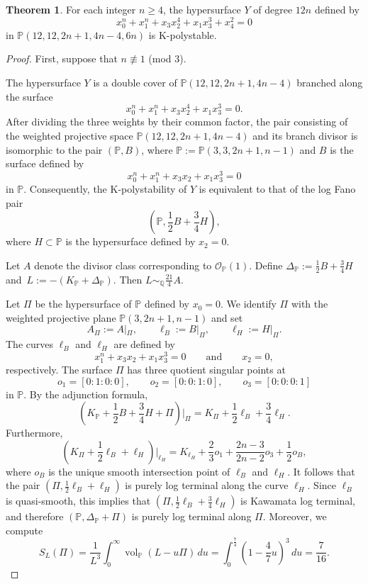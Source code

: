 \documentclass[12pt]{amsart}
\theoremstyle{definition}
\newtheorem{theorem}[equation]{Theorem}
\theoremstyle{remark}
\begin{document}
\begin{theorem}\label{theorem:h}
For each integer $n\geq 4$,  the hypersurface $Y$ of degree $12n$  defined by 
\[x_0^{n}+x_1^{n}+x_3x_2^4+x_1x_3^3+x_4^2=0\]
in $\mathbb{P}(12,12,2n+1,4n-4,6n)$
is K-polystable.
\end{theorem}
\begin{proof}
First, suppose that $n\not\equiv 1$ (mod $3$). 

The hypersurface $Y$ is a double cover of $\mathbb{P}(12,12,2n+1,4n-4)$ branched along the surface
\[
x_0^{n}+x_1^{n}+x_3x_2^4+x_1x_3^3=0.
\]
After dividing the three weights by their common factor, the pair consisting of the weighted projective space $\mathbb{P}(12,12,2n+1,4n-4)$ and its branch divisor is isomorphic to the pair $(\mathbb{P},B)$, where
$
\mathbb{P}:=\mathbb{P}(3,3,2n+1,n-1)$
and $B$ is the surface defined by
\[
x_0^{n}+x_1^{n}+x_3x_2+x_1x_3^3=0
\]
in $\mathbb{P}$.
Consequently, the K-polystability of $Y$ is equivalent to that of the log Fano pair
\[
\left(\mathbb{P}, \frac{1}{2}B+\frac{3}{4}H\right),
\]
where $H\subset \mathbb{P}$ is the hypersurface defined by $x_2=0$.



Let $A$ denote the divisor class corresponding to $\mathcal{O}_{\mathbb{P}}(1)$. Define
$\Delta_{\mathbb{P}}:=\frac{1}{2}B+\frac{3}{4}H$ and~$L:=-\left(K_{\mathbb{P}}+\Delta_{\mathbb{P}}\right)$.
Then
$
L\sim_{\mathbb{Q}}\frac{21}{4}A$.

Let $\Pi$  be the hypersurface of $\mathbb{P}$ defined by $x_0=0$. We identify $\Pi$ with the weighted projective plane $\mathbb{P}(3,2n+1,n-1)$ and set
\[
A_{\Pi}:=A|_{\Pi}, \qquad
\ell_B:=B|_{\Pi}, \qquad
\ell_H:=H|_{\Pi}.
\]
The curves $\ell_B$ and $\ell_H$ are defined by
\[
x_1^{n}+x_3x_2+x_1x_3^3=0
\qquad\text{and}\qquad
x_2=0,
\]
respectively. The surface $\Pi$ has three quotient singular points at
\[
o_1=[0:1:0:0], \qquad
o_2=[0:0:1:0], \qquad
o_3=[0:0:0:1]
\]
in $\mathbb{P}$.
By the adjunction formula,
\[
\left(K_{\mathbb{P}}+\frac{1}{2}B+\frac{3}{4}H+\Pi\right)\Big|_{\Pi}
=
K_{\Pi}+\frac{1}{2}\ell_B+\frac{3}{4}\ell_H.
\]
Furthermore,
\begin{equation}\label{eq:G2-LH}
\left(K_{\Pi}+\frac{1}{2}\ell_B+\ell_H\right)\Big|_{\ell_H}
=
K_{\ell_H}
+\frac{2}{3}o_1
+\frac{2n-3}{2n-2}o_3
+\frac{1}{2}o_B,
\end{equation}
where $o_B$ is the unique smooth intersection point of $\ell_B$ and $\ell_H$. It follows that the pair
$
\left(\Pi,\frac{1}{2}\ell_B+\ell_H\right)
$
is purely log terminal along the curve $\ell_H$. Since $\ell_B$ is quasi-smooth, this implies that 
$
\left(\Pi,\frac{1}{2}\ell_B+\frac{3}{4}\ell_H\right)
$
is Kawamata log terminal, and therefore
$
(\mathbb{P},\Delta_{\mathbb{P}}+\Pi)
$
is purely log terminal along $\Pi$.
Moreover, we compute
\[
S_L(\Pi)
=
\frac{1}{L^3}
\int_{0}^{\infty}
\operatorname{vol}_{\mathbb{P}}(L-u\Pi)\,du
=
\int_{0}^{\frac{7}{4}}
\left(1-\frac{4}{7}u\right)^3\,du
=
\frac{7}{16}.
\]




\end{proof}
\end{document}
